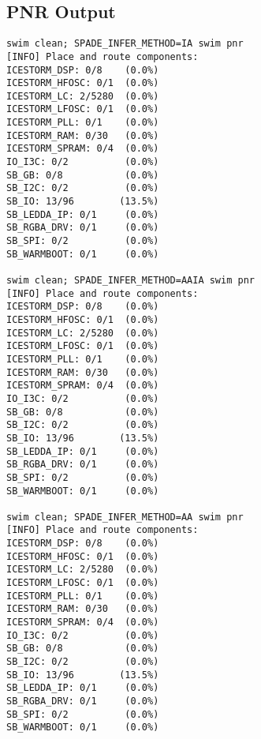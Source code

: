 \documentclass[msc,lith,english]{liuthesis}
\begin{document}
\subsection{PNR Output}
\begin{verbatim}
swim clean; SPADE_INFER_METHOD=IA swim pnr
[INFO] Place and route components:
ICESTORM_DSP: 0/8    (0.0%)
ICESTORM_HFOSC: 0/1  (0.0%)
ICESTORM_LC: 2/5280  (0.0%)
ICESTORM_LFOSC: 0/1  (0.0%)
ICESTORM_PLL: 0/1    (0.0%)
ICESTORM_RAM: 0/30   (0.0%)
ICESTORM_SPRAM: 0/4  (0.0%)
IO_I3C: 0/2          (0.0%)
SB_GB: 0/8           (0.0%)
SB_I2C: 0/2          (0.0%)
SB_IO: 13/96        (13.5%)
SB_LEDDA_IP: 0/1     (0.0%)
SB_RGBA_DRV: 0/1     (0.0%)
SB_SPI: 0/2          (0.0%)
SB_WARMBOOT: 0/1     (0.0%)

swim clean; SPADE_INFER_METHOD=AAIA swim pnr
[INFO] Place and route components:
ICESTORM_DSP: 0/8    (0.0%)
ICESTORM_HFOSC: 0/1  (0.0%)
ICESTORM_LC: 2/5280  (0.0%)
ICESTORM_LFOSC: 0/1  (0.0%)
ICESTORM_PLL: 0/1    (0.0%)
ICESTORM_RAM: 0/30   (0.0%)
ICESTORM_SPRAM: 0/4  (0.0%)
IO_I3C: 0/2          (0.0%)
SB_GB: 0/8           (0.0%)
SB_I2C: 0/2          (0.0%)
SB_IO: 13/96        (13.5%)
SB_LEDDA_IP: 0/1     (0.0%)
SB_RGBA_DRV: 0/1     (0.0%)
SB_SPI: 0/2          (0.0%)
SB_WARMBOOT: 0/1     (0.0%)

swim clean; SPADE_INFER_METHOD=AA swim pnr
[INFO] Place and route components:
ICESTORM_DSP: 0/8    (0.0%)
ICESTORM_HFOSC: 0/1  (0.0%)
ICESTORM_LC: 2/5280  (0.0%)
ICESTORM_LFOSC: 0/1  (0.0%)
ICESTORM_PLL: 0/1    (0.0%)
ICESTORM_RAM: 0/30   (0.0%)
ICESTORM_SPRAM: 0/4  (0.0%)
IO_I3C: 0/2          (0.0%)
SB_GB: 0/8           (0.0%)
SB_I2C: 0/2          (0.0%)
SB_IO: 13/96        (13.5%)
SB_LEDDA_IP: 0/1     (0.0%)
SB_RGBA_DRV: 0/1     (0.0%)
SB_SPI: 0/2          (0.0%)
SB_WARMBOOT: 0/1     (0.0%)
\end{verbatim}
\end{document}
